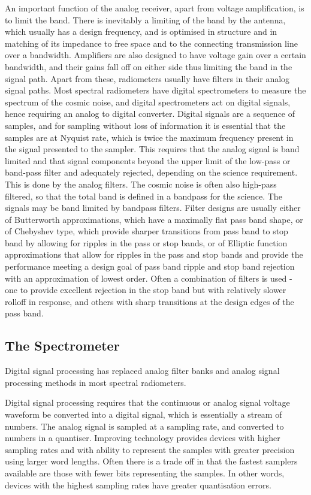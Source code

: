    An important function of the analog receiver, apart from voltage amplification, is to limit the band. There is inevitably a limiting of the band by the antenna, which usually has a design frequency, and is optimised in structure and in matching of its impedance to free space and to the connecting transmission line over a bandwidth.  Amplifiers are also designed to have voltage gain over a certain bandwidth, and their gains fall off on either side thus limiting the band in the signal path.  Apart from these, radiometers usually have filters in their analog signal paths. Most spectral radiometers have digital spectrometers to measure the spectrum of the cosmic noise, and digital spectrometers act on digital signals, hence requiring an analog to digital converter.  Digital signals are a sequence of samples, and for sampling without loss of information it is essential that the samples are at Nyquist rate, which is twice the maximum frequency present in the signal presented to the sampler. This requires that the analog signal is band limited and that signal components beyond the upper limit of the low-pass or band-pass filter and adequately rejected, depending on the science requirement. This is done by the analog filters.  The cosmic noise is often also high-pass filtered, so that the total band is defined in a bandpass for the science.  The signals may be band limited by bandpass filters.  Filter designs are usually either of Butterworth approximations, which have a maximally flat pass band shape, or of Chebyshev type, which provide sharper transitions from pass band to stop band by allowing for ripples in the pass or stop bands, or of Elliptic function approximations that allow for ripples in the pass and stop bands and provide the performance meeting a design goal of pass band ripple and stop band rejection with an approximation of lowest order.  Often a combination of filters is used - one to provide excellent rejection in the stop band but with relatively slower rolloff in response, and others with sharp transitions at the design edges of the pass band.  
   
\subsection{The Spectrometer}

  Digital signal processing has replaced analog filter banks and analog signal processing methods in most spectral radiometers. 
  
  Digital signal processing requires that the continuous or analog signal voltage waveform be converted into a digital signal, which is essentially a stream of numbers.  The analog signal is sampled at a sampling rate, and converted to numbers in a quantiser.  Improving technology provides devices with higher sampling rates and with ability to represent the samples with greater precision using larger word lengths.  Often there is a trade off in that the fastest samplers available are those with fewer bits representing the samples.  In other words, devices with the highest sampling rates have greater quantisation errors. 
  
